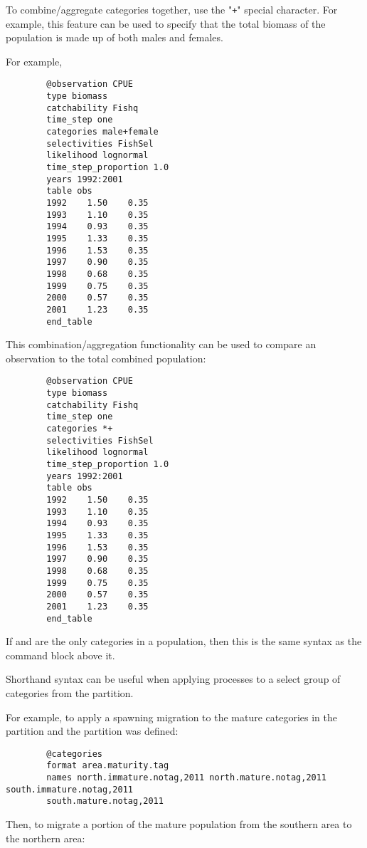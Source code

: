 To combine/aggregate categories together, use the "\texttt{+}" special character. For example, this feature can be used to specify that the total biomass of the population is made up of both males and females.

For example,

{\small{\begin{verbatim}
		@observation CPUE
		type biomass
		catchability Fishq
		time_step one
		categories male+female
		selectivities FishSel
		likelihood lognormal
		time_step_proportion 1.0
		years 1992:2001
		table obs
		1992    1.50    0.35
		1993    1.10    0.35
		1994    0.93    0.35
		1995    1.33    0.35
		1996    1.53    0.35
		1997    0.90    0.35
		1998    0.68    0.35
		1999    0.75    0.35
		2000    0.57    0.35
		2001    1.23    0.35
		end_table
		\end{verbatim}}}

This combination/aggregation functionality can be used to compare an observation to the total combined population:

{\small{\begin{verbatim}
		@observation CPUE
		type biomass
		catchability Fishq
		time_step one
		categories *+
		selectivities FishSel
		likelihood lognormal
		time_step_proportion 1.0
		years 1992:2001
		table obs
		1992    1.50    0.35
		1993    1.10    0.35
		1994    0.93    0.35
		1995    1.33    0.35
		1996    1.53    0.35
		1997    0.90    0.35
		1998    0.68    0.35
		1999    0.75    0.35
		2000    0.57    0.35
		2001    1.23    0.35
		end_table
		\end{verbatim}}}

If  and  are the only categories in a population, then this is the same syntax as the command block above it.

Shorthand syntax can be useful when applying processes to a select group of categories from the partition.

For example, to apply a spawning migration to the mature categories in the partition and the partition was defined:

{\small{\begin{verbatim}
		@categories
		format area.maturity.tag
		names north.immature.notag,2011 north.mature.notag,2011 south.immature.notag,2011
		south.mature.notag,2011
		\end{verbatim}}}

Then, to migrate a portion of the mature population from the southern area to the northern area:

